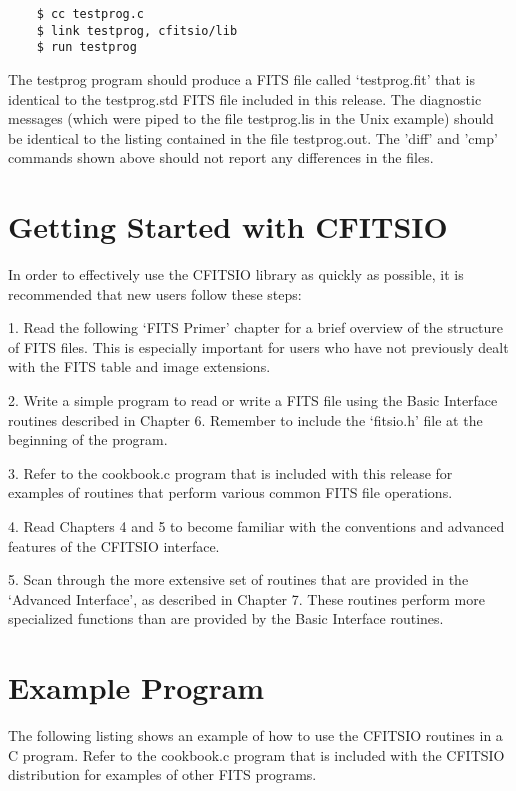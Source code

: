 \begin{verbatim}
    $ cc testprog.c
    $ link testprog, cfitsio/lib
    $ run testprog
\end{verbatim}
The testprog program should produce a FITS file called `testprog.fit'
that is identical to the testprog.std FITS file included in this
release.  The diagnostic messages (which were piped to the file
testprog.lis in the Unix example) should be identical to the listing
contained in the file testprog.out.  The 'diff' and 'cmp' commands
shown above should not report any differences in the files.


\section{Getting Started with CFITSIO}

In order to effectively use the CFITSIO library as quickly as possible,
it is recommended that new users follow these steps:

1.  Read the following `FITS Primer' chapter for a brief
overview of the structure of FITS files.  This is especially important
for users who have not previously dealt with the FITS table and image
extensions.

2.  Write a simple program to read or write a FITS file using the Basic
Interface routines described in Chapter 6.  Remember to include the
`fitsio.h' file at the beginning of the program.

3.  Refer to the cookbook.c program that is included with this release
for examples of routines that perform various common FITS file
operations.

4. Read Chapters 4 and 5 to become familiar with the conventions and
advanced features of the CFITSIO interface.

5.  Scan through the more extensive set of routines that are provided
in the `Advanced Interface', as described in Chapter 7.  These routines
perform more specialized functions than are provided by the Basic
Interface routines.


\section{Example Program}

The following listing shows an example of how to use the CFITSIO
routines in a C program.  Refer to the cookbook.c program that
is included with the CFITSIO distribution for examples of other
FITS programs.


